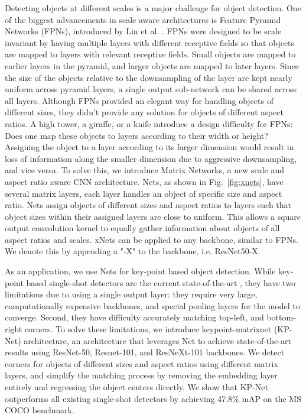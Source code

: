 \documentclass[10pt,twocolumn,letterpaper]{article}
\begin{document}
Detecting objects at different scales is a major challenge for object detection. One of the biggest advancements in scale aware architectures is Feature Pyramid Networks (FPNs), introduced by Lin et al. \cite{lin2017feature}. FPNs were designed to be scale invariant by having multiple layers with different receptive fields so that objects are mapped to layers with relevant receptive fields. Small objects are mapped to earlier layers in the pyramid, and larger objects are mapped to later layers. Since the size of the objects relative to the downsampling of the layer are kept nearly uniform across pyramid layers, a single output sub-network can be shared across all layers. Although FPNs provided an elegant way for handling objects of different sizes, they didn't provide any solution for objects of different aspect ratios. A high tower, a giraffe, or a knife introduce a design difficulty for FPNs: Does one map these objects to layers according to their width or height? Assigning the object to a layer according to its larger dimension would result in loss of information along the smaller dimension due to aggressive downsampling, and vice versa. To solve this, we introduce Matrix Networks, a new scale and aspect ratio aware CNN architecture. Nets, as shown in Fig.~\ref{fig:xnets}, have several matrix layers, each layer handles an object of specific size and aspect ratio. Nets assign objects of different sizes and aspect ratios to layers such that object sizes within their assigned layers are close to uniform. This allows a square output convolution kernel to equally gather information about objects of all aspect ratios and scales. xNets can be applied to any backbone, similar to FPNs. We denote this by appending a "-X" to the backbone, i.e. ResNet50-X.

As an application, we use Nets for key-point based object detection. While key-point based single-shot detectors are the current state-of-the-art \cite{duan2019centernet}, they have two limitations due to using a single output layer: 
they require very large, computationally expensive backbones, and special pooling layers for the model to converge. Second, they have difficulty accurately matching top-left, and bottom-right corners. To solve these limitations, we introduce keypoint-matrixnet (KP-Net) architecture, an architecture that leverages Net to achieve state-of-the-art results using ResNet-50, Resnet-101, and ResNeXt-101 backbones. We detect corners for objects of different sizes and aspect ratios using different matrix layers, and simplify the matching process by removing the embedding layer entirely and regressing the object centers directly. We show that KP-Net outperforms all existing single-shot detectors by achieving 47.8\% mAP on the MS COCO benchmark.
\end{document}
